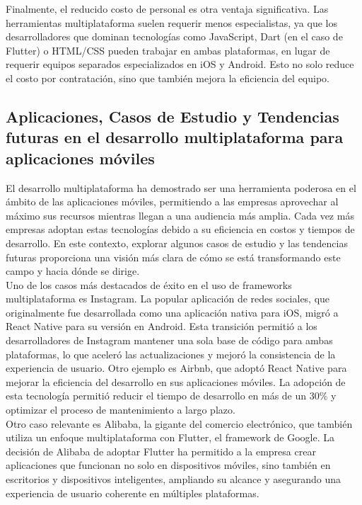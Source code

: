Finalmente, el reducido costo de personal es otra ventaja significativa. Las herramientas multiplataforma
suelen requerir menos especialistas, ya que los desarrolladores que dominan tecnologías como JavaScript,
Dart (en el caso de Flutter) o HTML/CSS pueden trabajar en ambas plataformas, en lugar de requerir equipos
separados especializados en iOS y Android. Esto no solo reduce el costo por contratación, sino que
también mejora la eficiencia del equipo.

\subsection{Aplicaciones, Casos de Estudio y Tendencias futuras en el desarrollo multiplataforma para aplicaciones móviles}
El desarrollo multiplataforma ha demostrado ser una herramienta poderosa en el ámbito de las aplicaciones móviles, permitiendo
a las empresas aprovechar al máximo sus recursos mientras llegan a una audiencia más amplia. Cada vez más empresas adoptan
estas tecnologías debido a su eficiencia en costos y tiempos de desarrollo. En este contexto, explorar algunos casos de estudio
y las tendencias futuras proporciona una visión más clara de cómo se está transformando este campo y hacia dónde se dirige.\\

Uno de los casos más destacados de éxito en el uso de frameworks multiplataforma es Instagram. La popular aplicación de redes
sociales, que originalmente fue desarrollada como una aplicación nativa para iOS, migró a React Native para su versión en
Android. Esta transición permitió a los desarrolladores de Instagram mantener una sola base de código para ambas plataformas,
lo que aceleró las actualizaciones y mejoró la consistencia de la experiencia de usuario. Otro ejemplo es Airbnb, que adoptó
React Native para mejorar la eficiencia del desarrollo en sus aplicaciones móviles. La adopción de esta tecnología permitió
reducir el tiempo de desarrollo en más de un 30\% y optimizar el proceso de mantenimiento a largo plazo.\\

Otro caso relevante es Alibaba, la gigante del comercio electrónico, que también utiliza un enfoque multiplataforma con Flutter,
el framework de Google. La decisión de Alibaba de adoptar Flutter ha permitido a la empresa crear aplicaciones que funcionan no
solo en dispositivos móviles, sino también en escritorios y dispositivos inteligentes, ampliando su alcance y asegurando una
experiencia de usuario coherente en múltiples plataformas.\\

